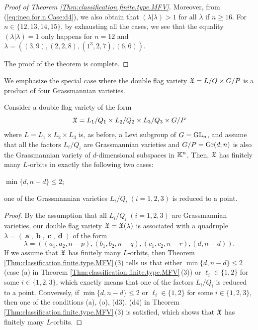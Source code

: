 \documentclass[12pt,reqno]{amsart}
\begin{document}
\begin{proof}[Proof  of Theorem \ref{Thm:classification.finite.type.MFV}]
Moreover, from (\ref{eq:ineq.for.n.Case:d4}), we also obtain that $(\lambda|\lambda)>1$ for all $\lambda$ if $n\geq 16$. For $n\in\{12,13,14,15\}$, by exhausting all the cases, we see that the equality $(\lambda|\lambda)=1$ only happens for $n=12$ and $\lambda=((3,9),(2,2,8),(1^3,2,7),(6,6))$.

The proof of the theorem is complete.
\end{proof}

We emphasize the special case where the double flag variety $\mathfrak{X}=L/Q\times G/P$ is a product of four Grassmannian varieties.

\begin{corollary}\label{corollary:grassmannians}
Consider a double flag variety of the form
$$
\mathfrak{X}=L_1/Q_1 \times L_2/Q_2 \times L_3/Q_3 \times G/P
$$
where
$L=L_1\times L_2\times L_3$ is, as before, a Levi subgroup of $G=\mathrm{GL}_n$,
and assume that all the factors $L_i/Q_i$ are Grassmannian varieties
and $G/P=\mathrm{Gr}(d;n)$ is also the Grassmannian variety of $d$-dimensional subspaces in $\mathbb{K}^n$.
Then, $\mathfrak{X}$ has finitely many $L$-orbits in exactly the following two cases:
\begin{penumerate}
    \item $\min\{d,n-d\}\leq 2$;
    \item one of the Grassmannian varieties $L_i/Q_i \; (i = 1, 2, 3) $ is reduced to a point.
\end{penumerate}
\end{corollary}

\begin{proof}
By the assumption that all $ L_i/Q_i \; (i = 1, 2, 3) $ are Grassmannian varieties,
our double flag variety $\mathfrak{X}=\mathfrak{X}(\lambda)$ is associated with
a quadruple $\lambda=(\mbfa,\mbfb,\mbfc,\mbfd)$ of the form
$$
\lambda=((a_1,a_2,n-p),(b_1,b_2,n-q),(c_1,c_2,n-r),(d,n-d)).
$$
If we assume that $\mathfrak{X}$ has finitely many $L$-orbits, then
Theorem \ref{Thm:classification.finite.type.MFV}\,(3) tells us that either $\min\{d,n-d\}\leq 2$
(case (a) in Theorem \ref{Thm:classification.finite.type.MFV}\,(3))
or $\ell_i\in\{1,2\}$ for some $i\in\{1,2,3\}$,
which exactly means that
one of the factors $L_i/Q_i$ is reduced to a point.
Conversely, if $\min\{d,n-d\}\leq 2$ or $\ell_i\in\{1,2\}$ for some $i\in\{1,2,3\}$,
then one of the conditions (a), (o), (d3), (d4) in Theorem \ref{Thm:classification.finite.type.MFV}\,(3) is satisfied, which shows that $\mathfrak{X}$  has finitely many $L$-orbits.
\end{proof}
\end{document}
